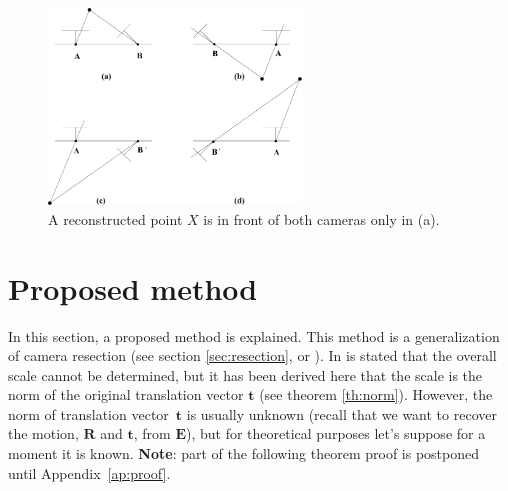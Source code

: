 \begin{figure}[!htbp]
 \centering
 \includegraphics[width=0.6\textwidth]{images/resection.pdf}
 \caption{A reconstructed point $X$ is in front of both cameras only in (a).}
 \label{fig:resection}
\end{figure}
%



\section{Proposed method}

In this section, a proposed method is explained. This method is a generalization of camera resection (see section \ref{sec:resection}, or \cite[Result 9.19]{HZ2}). In \cite[p258, section 9.6.2]{HZ2} is stated that the overall scale cannot be determined,
but it has been derived here that the scale is the norm of the original translation vector $\mathbf{t}$  (see theorem \ref{th:norm}). However, the norm of translation vector~$\mathbf{t}$ is usually unknown (recall that we want to recover the motion, $\mathbf{R}$ and $\mathbf{t}$, from $\mathbf{E}$), but for theoretical purposes let's suppose for a moment it is known. \textbf{Note}: part of the following theorem proof is postponed until Appendix~\ref{ap:proof}.





